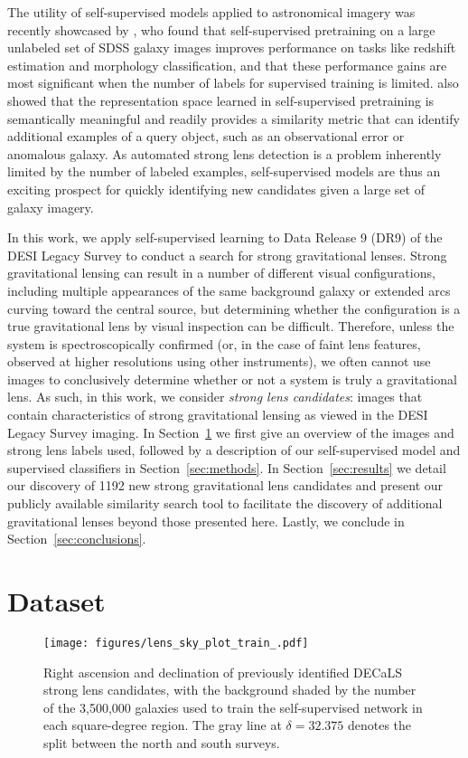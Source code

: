 \documentclass{aastex631}
\begin{document}
The utility of self-supervised models applied to astronomical imagery was recently showcased by \cite{Hayat_2021}, who found that self-supervised pretraining on a large unlabeled set of SDSS galaxy images improves performance on tasks like redshift estimation and morphology classification, and that these performance gains are most significant when the number of labels for supervised training is limited. \cite{Hayat_2021} also showed that the representation space learned in self-supervised pretraining is semantically meaningful and readily provides a similarity metric that can identify additional examples of a query object, such as an observational error or anomalous galaxy. As automated strong lens detection is a problem inherently limited by the number of labeled examples, self-supervised models are thus an exciting prospect for quickly identifying new candidates given a large set of galaxy imagery.

In this work, we apply self-supervised learning to Data Release 9 (DR9) of the DESI Legacy Survey \citep{DECaLS} to conduct a search for strong gravitational lenses. Strong gravitational lensing can result in a number of different visual configurations, including multiple appearances of the same background galaxy or extended arcs curving toward the  central source, but determining whether the configuration is a true gravitational lens by visual inspection can be difficult. Therefore, unless the system is spectroscopically confirmed (or, in the case of faint lens features, observed at higher resolutions using other instruments), we often cannot use images to conclusively determine whether or not a system is truly a gravitational lens. As such, in this work, we consider {\textit{strong lens candidates}}: images that contain characteristics of strong gravitational lensing as viewed in the DESI Legacy Survey imaging. In Section~\ref{sec:data} we first give an overview of the images and strong lens labels used, followed by a description of our self-supervised model and supervised classifiers in Section~\ref{sec:methods}. In Section~\ref{sec:results} we detail our discovery of 1192 new strong gravitational lens candidates and present our publicly available similarity search tool to facilitate the discovery of additional gravitational lenses beyond those presented here.  Lastly, we conclude in Section~\ref{sec:conclusions}.

\section{Dataset}
\label{sec:data}
\begin{figure*}
    \centering
    \texttt{[image: figures/lens\_sky\_plot\_train\_.pdf]}
    \caption{Right ascension and declination of previously identified DECaLS strong lens candidates, with the background shaded by the number of the 3,500,000 galaxies used to train the self-supervised network in each square-degree region. The gray line at $\delta=32.375$ denotes the split between the north and south surveys.}
    \label{fig:sky_plot_data}
\end{figure*}
\end{document}
